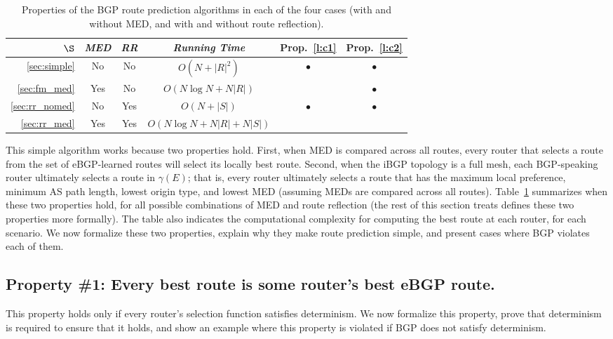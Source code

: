 \begin{table}[t]
\begin{center}
\begin{small}
\begin{tabular}{r|cc|ccc}
$\S$ & {\em MED} & {\em RR} & {\em Running Time} & Prop.~\ref{l:c1}
  & Prop.~\ref{l:c2} \\ \hline 
\ref{sec:simple} & No & No & $O(N+|R|^2)$ & $\bullet$ & $\bullet$ \\ 
\ref{sec:fm_med} &Yes & No & $O(N \log N+ N|R|)$ &  & $\bullet$ \\ 
\ref{sec:rr_nomed} &No & Yes & $O(N+|S|)$ & $\bullet$ & $\bullet$  \\ 
\ref{sec:rr_med} &Yes & Yes & $O(N \log N + N|R| + N|S|)$ & &  \\ 
\end{tabular}
\end{small}
\end{center}
\caption{Properties of the BGP route prediction algorithms in each of the four
  cases (with and without MED, and with and without route reflection).} 
\label{tab:runningtimes}
\end{table}

This simple algorithm works because two properties hold.  First, when
MED is compared across all routes, every router that selects a route
from the set of eBGP-learned routes will select its locally best route.
Second, when the iBGP topology is a full mesh, each BGP-speaking router
ultimately selects a route in $\gamma(E)$; that is, every router
ultimately selects a route that has the maximum local preference,
minimum AS path length, lowest origin type, and lowest MED (assuming
MEDs are compared across all routes).  Table~\ref{tab:runningtimes}
summarizes when these two properties hold, for all
possible combinations of MED and route reflection (the rest of this
section treats defines these two properties more formally).  The table also
indicates the computational complexity for computing the best route at
each router, for each scenario.  We now formalize these two properties,
explain why they make route prediction simple, and present cases where
BGP violates each of them.


\subsection{Property \#1: Every best route is some router's
  best eBGP route.}

This property holds only if every router's selection function satisfies
determinism.  We now formalize this property, prove that determinism
is required to ensure that it holds, and show an example where this
property is violated if BGP does not satisfy determinism.


